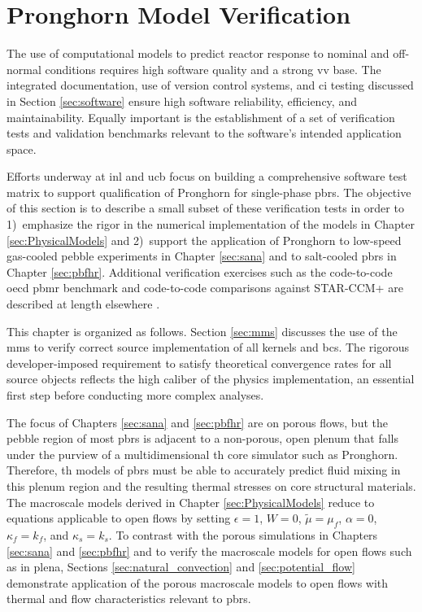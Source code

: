\chapter{Pronghorn Model Verification}
\label{sec:vv}

The use of computational models to predict reactor response to nominal and off-normal conditions requires high software quality and a strong \gls{vv} base. The integrated documentation, use of version control systems, and \gls{ci} testing discussed in Section \ref{sec:software} ensure high software reliability, efficiency, and maintainability. Equally important is the establishment of a set of verification tests and validation benchmarks relevant to the software's intended application space. 

Efforts underway at \gls{inl} and \gls{ucb} focus on building a comprehensive software test matrix to support qualification of Pronghorn for single-phase \glspl{pbr}. The objective of this section is to describe a small subset of these verification tests in order to 1)~emphasize the rigor in the numerical implementation of the models in Chapter \ref{sec:PhysicalModels} and 2)~support the application of Pronghorn to low-speed gas-cooled pebble experiments in Chapter \ref{sec:sana} and to salt-cooled \glspl{pbr} in Chapter \ref{sec:pbfhr}. Additional verification exercises such as the code-to-code \gls{oecd} \gls{pbmr} benchmark and code-to-code comparisons against STAR-CCM+ are described at length elsewhere \cite{balestra,lee_2020}.

This chapter is organized as follows. Section \ref{sec:mms} discusses the use of the \gls{mms} to verify correct source implementation of all kernels and \glspl{bc}. The rigorous developer-imposed requirement to satisfy theoretical convergence rates for all source objects reflects the high caliber of the physics implementation, an essential first step before conducting more complex analyses.

The focus of Chapters \ref{sec:sana} and \ref{sec:pbfhr} are on porous flows, but the pebble region of most \glspl{pbr} is adjacent to a non-porous, open plenum that falls under the purview of a multidimensional \gls{th} core simulator such as Pronghorn. Therefore, \gls{th} models of \glspl{pbr} must be able to accurately predict fluid mixing in this plenum region and the resulting thermal stresses on core structural materials. The macroscale models derived in Chapter \ref{sec:PhysicalModels} reduce to equations applicable to open flows by setting \(\epsilon=1\), \(W=0\), \(\tilde{\mu}=\mu_f\), \(\alpha=0\), \(\kappa_f=k_f\), and \(\kappa_s=k_s\). To contrast with the porous simulations in Chapters \ref{sec:sana} and \ref{sec:pbfhr} and to verify the macroscale models for open flows such as in plena, Sections \ref{sec:natural_convection} and \ref{sec:potential_flow} demonstrate application of the porous macroscale models to open flows with thermal and flow characteristics relevant to \glspl{pbr}.

